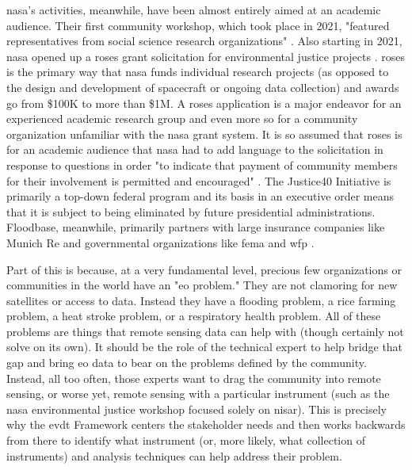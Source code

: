 \ac{nasa}'s activities, meanwhile, have been almost entirely aimed at an academic audience. Their first community workshop, which took place in 2021, "featured representatives from social science research organizations" \cite{bollesEquityEnvironmentalJustice2021}. Also starting in 2021, \ac{nasa} opened up a \ac{roses} grant solicitation for environmental justice projects \cite{bollesEquityEnvironmentalJustice2021}. \ac{roses} is the primary way that \ac{nasa} funds individual research projects (as opposed to the design and development of spacecraft or ongoing data collection) and awards go from \$100K to more than \$1M. A \ac{roses} application is a major endeavor for an experienced academic research group and even more so for a community organization unfamiliar with the \ac{nasa} grant system. It is so assumed that \ac{roses} is for an academic audience that \ac{nasa} had to add language to the solicitation in response to questions in order "to indicate that payment of community members for their involvement is permitted and encouraged" \cite{kinardkarshelia49EarthScience2022}. The Justice40 Initiative is primarily a top-down federal program and its basis in an executive order means that it is subject to being eliminated by future presidential administrations.  Floodbase, meanwhile, primarily partners with large insurance companies like Munich Re and governmental organizations like \ac{fema} and \ac{wfp} \cite{floodbaseFloodMonitoringSudan2022, floodbaseAnnouncingOurWork2023, rostonClimateStartupAims2023}.

Part of this is because, at a very fundamental level, precious few organizations or communities in the world have an "\ac{eo} problem." They are not clamoring for new satellites or access to data. Instead they have a flooding problem, a rice farming problem, a heat stroke problem, or a respiratory health problem. All of these problems are things that remote sensing data can help with (though certainly not solve on its own). It should be the role of the technical expert to help bridge that gap and bring \ac{eo} data to bear on the problems defined by the community. Instead, all too often, those experts want to drag the community into remote sensing, or worse yet, remote sensing with a particular instrument (such as the \ac{nasa} environmental justice workshop focused solely on \ac{nisar}). This is precisely why the \ac{evdt} Framework centers the stakeholder needs and then works backwards from there to identify what instrument (or, more likely, what collection of instruments) and analysis techniques can help address their problem.

